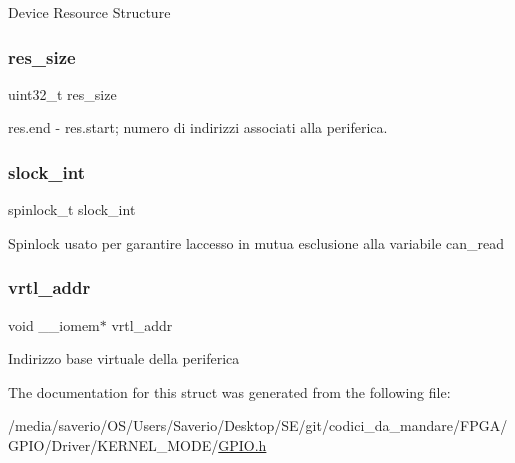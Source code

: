Device Resource Structure \mbox{\label{structGPIO_aecb03114c495140683cbdd552214bc75}} 
\subsubsection{\texorpdfstring{res\+\_\+size}{res\_size}}
{\footnotesize\ttfamily uint32\+\_\+t res\+\_\+size}

res.\+end -\/ res.\+start; numero di indirizzi associati alla periferica. \mbox{\label{structGPIO_a1e1ddf972b4dc84dd331a0c72e5d9895}} 
\subsubsection{\texorpdfstring{slock\+\_\+int}{slock\_int}}
{\footnotesize\ttfamily spinlock\+\_\+t slock\+\_\+int}

Spinlock usato per garantire l\textquotesingle{}accesso in mutua esclusione alla variabile can\+\_\+read \mbox{\label{structGPIO_a9b5bc69d3a72a01759531f90e71c8850}} 
\subsubsection{\texorpdfstring{vrtl\+\_\+addr}{vrtl\_addr}}
{\footnotesize\ttfamily void \+\_\+\+\_\+iomem$\ast$ vrtl\+\_\+addr}

Indirizzo base virtuale della periferica 

The documentation for this struct was generated from the following file\+:\begin{DoxyCompactItemize}
\item 
/media/saverio/\+O\+S/\+Users/\+Saverio/\+Desktop/\+S\+E/git/codici\+\_\+da\+\_\+mandare/\+F\+P\+G\+A/\+G\+P\+I\+O/\+Driver/\+K\+E\+R\+N\+E\+L\+\_\+\+M\+O\+D\+E/\hyperlink{GPIO_8h}{G\+P\+I\+O.\+h}\end{DoxyCompactItemize}
